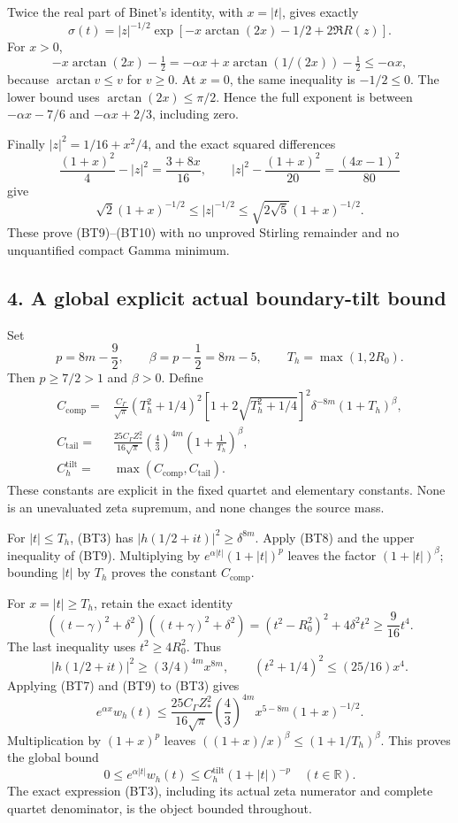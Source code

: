 \documentclass[11pt,a4paper]{article}
\begin{document}
Twice the real part of Binet's identity, with \(x=|t|\), gives exactly \[
\sigma(t)=|z|^{-1/2}
 \exp[-x\arctan(2x)-1/2+2\Re R(z)].
\] For \(x>0\), \[
-x\arctan(2x)-\tfrac12
=-\alpha x+x\arctan(1/(2x))-\tfrac12
\le-\alpha x,
\] because \(\arctan v\le v\) for \(v\ge0\). At \(x=0\), the same inequality is \(-1/2\le0\). The lower bound uses \(\arctan(2x)\le\pi/2\). Hence the full exponent is between \(-\alpha x-7/6\) and \(-\alpha x+2/3\), including zero.

Finally \(|z|^2=1/16+x^2/4\), and the exact squared differences \[
\frac{(1+x)^2}{4}-|z|^2=\frac{3+8x}{16},\qquad
|z|^2-\frac{(1+x)^2}{20}=\frac{(4x-1)^2}{80}
\] give \[
\sqrt2(1+x)^{-1/2}\le |z|^{-1/2}
\le\sqrt{2\sqrt5}(1+x)^{-1/2}.
\] These prove (BT9)--(BT10) with no unproved Stirling remainder and no unquantified compact Gamma minimum.

\subsection{4. A global explicit actual boundary-tilt bound}\label{a-global-explicit-actual-boundary-tilt-bound}

Set \[
p=8m-\frac92,\qquad \beta=p-\frac12=8m-5,\qquad
T_h=\max(1,2R_0).
\tag{BT11}
\] Then \(p\ge7/2>1\) and \(\beta>0\). Define \[
\begin{split}
C_{\mathrm{comp}}
={}&\frac{C_\Gamma}{\sqrt\pi}
 (T_h^2+1/4)^2
 [1+2\sqrt{T_h^2+1/4}]^2
 \delta^{-8m}(1+T_h)^\beta,\\
C_{\mathrm{tail}}
={}&\frac{25C_\Gamma Z_*^2}{16\sqrt\pi}
 \left(\frac43\right)^{4m}
 \left(1+\frac1{T_h}\right)^\beta,\\
C_h^{\mathrm{tilt}}
={}&\max(C_{\mathrm{comp}},C_{\mathrm{tail}}).
\end{split}
\tag{BT12}
\] These constants are explicit in the fixed quartet and elementary constants. None is an unevaluated zeta supremum, and none changes the source mass.

For \(|t|\le T_h\), (BT3) has \(|h(1/2+it)|^2\ge\delta^{8m}\). Apply (BT8) and the upper inequality of (BT9). Multiplying by \(e^{\alpha|t|}(1+|t|)^p\) leaves the factor \((1+|t|)^\beta\); bounding \(|t|\) by \(T_h\) proves the constant \(C_{\mathrm{comp}}\).

For \(x=|t|\ge T_h\), retain the exact identity \[
((t-\gamma)^2+\delta^2)((t+\gamma)^2+\delta^2)
=(t^2-R_0^2)^2+4\delta^2t^2
\ge\frac9{16}t^4.
\tag{BT13}
\] The last inequality uses \(t^2\ge4R_0^2\). Thus \[
|h(1/2+it)|^2\ge(3/4)^{4m}x^{8m},
\qquad
(t^2+1/4)^2\le(25/16)x^4.
\] Applying (BT7) and (BT9) to (BT3) gives \[
e^{\alpha x}w_h(t)
\le\frac{25C_\Gamma Z_*^2}{16\sqrt\pi}
\left(\frac43\right)^{4m}
x^{5-8m}(1+x)^{-1/2}.
\] Multiplication by \((1+x)^p\) leaves \(((1+x)/x)^\beta\le(1+1/T_h)^\beta\). This proves the global bound \[
\boxed{
0\le e^{\alpha|t|}w_h(t)
\le C_h^{\mathrm{tilt}}(1+|t|)^{-p}
\quad(t\in\mathbb R).}
\tag{BT14}
\] The exact expression (BT3), including its actual zeta numerator and complete quartet denominator, is the object bounded throughout.
\end{document}
